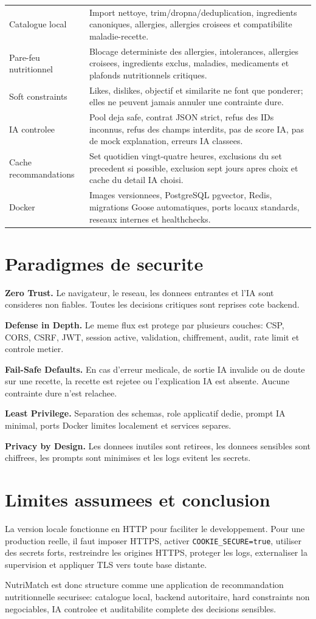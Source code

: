 \documentclass[10pt,a4paper]{article}
\begin{document}
\begin{tabularx}{\textwidth}{@{}L{3.8cm}Y@{}}
Catalogue local & Import nettoye, trim/dropna/deduplication, ingredients canoniques, allergies, allergies croisees et compatibilite maladie-recette. \\
Pare-feu nutritionnel & Blocage deterministe des allergies, intolerances, allergies croisees, ingredients exclus, maladies, medicaments et plafonds nutritionnels critiques. \\
Soft constraints & Likes, dislikes, objectif et similarite ne font que ponderer; elles ne peuvent jamais annuler une contrainte dure. \\
IA controlee & Pool deja safe, contrat JSON strict, refus des IDs inconnus, refus des champs interdits, pas de score IA, pas de mock explanation, erreurs IA classees. \\
Cache recommandations & Set quotidien vingt-quatre heures, exclusions du set precedent si possible, exclusion sept jours apres choix et cache du detail IA choisi. \\
Docker & Images versionnees, PostgreSQL pgvector, Redis, migrations Goose automatiques, ports locaux standards, reseaux internes et healthchecks. \\
\bottomrule
\end{tabularx}

\section{Paradigmes de securite}
\textbf{Zero Trust.} Le navigateur, le reseau, les donnees entrantes et l'IA sont consideres non fiables. Toutes les decisions critiques sont reprises cote backend.

\textbf{Defense in Depth.} Le meme flux est protege par plusieurs couches: CSP, CORS, CSRF, JWT, session active, validation, chiffrement, audit, rate limit et controle metier.

\textbf{Fail-Safe Defaults.} En cas d'erreur medicale, de sortie IA invalide ou de doute sur une recette, la recette est rejetee ou l'explication IA est absente. Aucune contrainte dure n'est relachee.

\textbf{Least Privilege.} Separation des schemas, role applicatif dedie, prompt IA minimal, ports Docker limites localement et services separes.

\textbf{Privacy by Design.} Les donnees inutiles sont retirees, les donnees sensibles sont chiffrees, les prompts sont minimises et les logs evitent les secrets.

\section{Limites assumees et conclusion}
La version locale fonctionne en HTTP pour faciliter le developpement. Pour une production reelle, il faut imposer HTTPS, activer \texttt{COOKIE\_SECURE=true}, utiliser des secrets forts, restreindre les origines HTTPS, proteger les logs, externaliser la supervision et appliquer TLS vers toute base distante.

NutriMatch est donc structure comme une application de recommandation nutritionnelle securisee: catalogue local, backend autoritaire, hard constraints non negociables, IA controlee et auditabilite complete des decisions sensibles.
\end{document}
